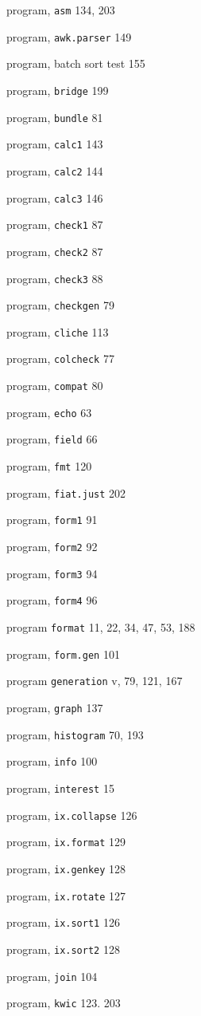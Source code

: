 \begin{multicols}{2}
program, \verb'asm' 134, 203

program, \verb'awk.parser' 149

program, batch sort test 155

program, \verb'bridge' 199

program, \verb'bundle' 81

program, \verb'calc1' 143

program, \verb'calc2' 144

program, \verb'calc3' 146

program, \verb'check1' 87

program, \verb'check2' 87

program, \verb'check3' 88

program, \verb'checkgen' 79

program, \verb'cliche' 113

program, \verb'colcheck' 77

program, \verb'compat' 80

program, \verb'echo' 63

program, \verb'field' 66

program, \verb'fmt' 120

program, \verb'fiat.just' 202

program, \verb'form1' 91

program, \verb'form2' 92

program, \verb'form3' 94

program, \verb'form4' 96

program \verb'format' 11, 22, 34, 47, 53, 188

program, \verb'form.gen' 101

program \verb'generation' v, 79, 121, 167

program, \verb'graph' 137

program, \verb'histogram' 70, 193

program, \verb'info' 100

program, \verb'interest' 15

program, \verb'ix.collapse' 126

program, \verb'ix.format' 129

program, \verb'ix.genkey' 128

program, \verb'ix.rotate' 127

program, \verb'ix.sort1' 126

program, \verb'ix.sort2' 128

program, \verb'join' 104

program, \verb'kwic' 123. 203


\end{multicols}

